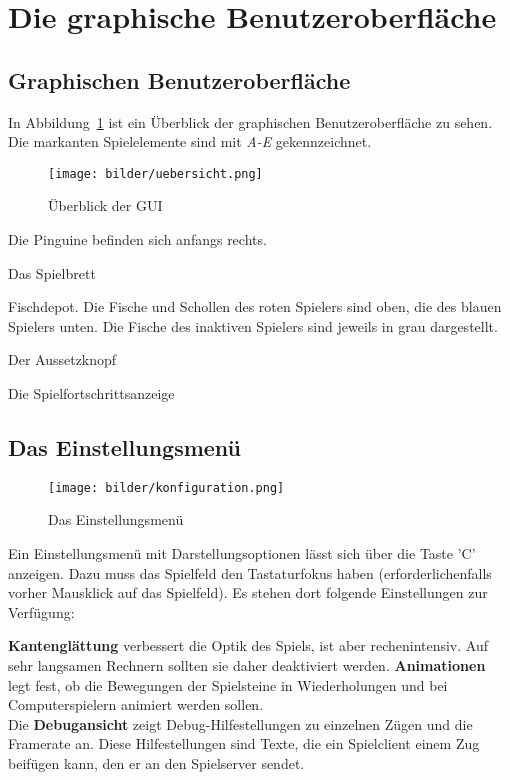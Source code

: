 \documentclass[a4paper, ngerman]{scrartcl}
\begin{document}
\section{Die graphische Benutzeroberfläche}
\subsection{Graphischen Benutzeroberfläche}
	In Abbildung~\ref{fig:GUI} ist ein Überblick der graphischen Benutzeroberfläche
	zu sehen. Die markanten Spielelemente sind mit \emph{A-E} gekennzeichnet.
	
	 \begin{figure}[h!]
		\centering		
		\texttt{[image: bilder/uebersicht.png]} 
		\caption{Überblick der GUI}
		\label{fig:GUI}
	\end{figure} 
\begin{compactenum}[A)] 
\item Die Pinguine befinden sich anfangs rechts.
\item Das Spielbrett  
\item Fischdepot.
 Die Fische und Schollen des roten Spielers sind 
oben, die des blauen Spielers unten. Die Fische des inaktiven Spielers sind
jeweils in grau dargestellt.
\item Der Aussetzknopf
\item  Die Spielfortschrittsanzeige
	\end{compactenum}
	
\subsection{Das Einstellungsmenü} 
	 \begin{figure}[h!]
		\centering
		\texttt{[image: bilder/konfiguration.png]}
		\caption{Das Einstellungsmenü}
		\label{fig:Configuration}
	\end{figure}
	
	Ein Einstellungsmenü mit Darstellungsoptionen lässt
sich über die Taste 'C' anzeigen. Dazu muss das
Spielfeld den Tastaturfokus haben (erforderlichenfalls
vorher Mausklick auf das Spielfeld). Es stehen dort
folgende Einstellungen zur Verfügung: 

\textbf{Kantenglättung} verbessert die Optik des
Spiels, ist aber rechenintensiv. Auf sehr langsamen Rechnern sollten sie daher
deaktiviert werden.
\textbf{Animationen} legt fest, ob die Bewegungen der Spielsteine in
Wiederholungen und bei Computerspielern animiert werden sollen.\\
Die \textbf{Debugansicht} zeigt Debug-Hilfestellungen zu einzelnen Zügen und
die Framerate an.
Diese Hilfestellungen sind Texte, die ein Spielclient einem Zug beifügen kann, den er
an den Spielserver sendet.
	
\end{document}
